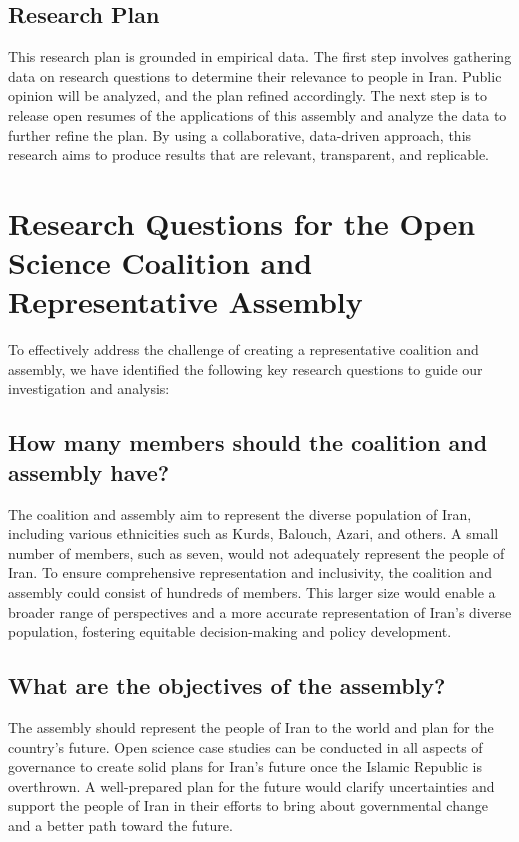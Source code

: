 \documentclass{IEEEtran}
\begin{document}
\subsection{Research Plan}
This research plan is grounded in empirical data. The first step involves gathering data on research questions to determine their relevance to people in Iran. Public opinion will be analyzed, and the plan refined accordingly. The next step is to release open resumes of the applications of this assembly and analyze the data to further refine the plan.
By using a collaborative, data-driven approach, this research aims to produce results that are relevant, transparent, and replicable.
\section{Research Questions for the Open Science Coalition and Representative Assembly}

To effectively address the challenge of creating a representative coalition and assembly, we have identified the following key research questions to guide our investigation and analysis:

\subsection{How many members should the coalition and assembly have?}
The coalition and assembly aim to represent the diverse population of Iran, including various ethnicities such as Kurds, Balouch, Azari, and others. A small number of members, such as seven, would not adequately represent the people of Iran. To ensure comprehensive representation and inclusivity, the coalition and assembly could consist of hundreds of members. This larger size would enable a broader range of perspectives and a more accurate representation of Iran's diverse population, fostering equitable decision-making and policy development.

\subsection{What are the objectives of the assembly?}
The assembly should represent the people of Iran to the world and plan for the country's future. Open science case studies can be conducted in all aspects of governance to create solid plans for Iran's future once the Islamic Republic is overthrown. A well-prepared plan for the future would clarify uncertainties and support the people of Iran in their efforts to bring about governmental change and a better path toward the future.
\end{document}
